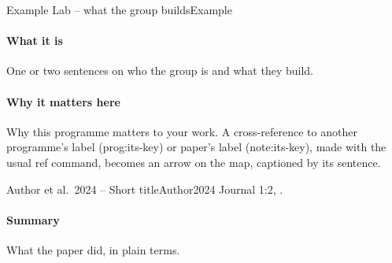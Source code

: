 \documentclass[11pt, a4paper]{article}
\begin{document}
\tableofcontents
\clearpage

\begin{programnote}{Example Lab -- what the group builds}{Example}

\paragraph{What it is}
One or two sentences on who the group is and what they build.

\paragraph{Why it matters here}
Why this programme matters to your work. A cross-reference to another
programme's label (prog:its-key) or paper's label (note:its-key), made with
the usual ref command, becomes an arrow on the map, captioned by its sentence.

\begin{papernote}{Author et al.\ 2024 -- Short title}{Author2024}
Journal 1:2, .

\paragraph{Summary}
What the paper did, in plain terms. 

\end{papernote}

\end{programnote}
\end{document}
